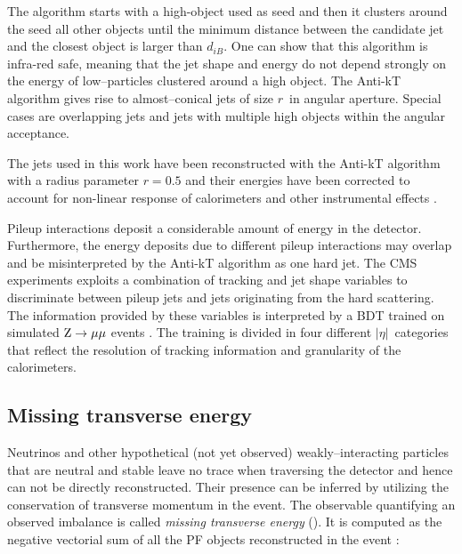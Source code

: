 The algorithm starts with a high-\pT object used as seed and then it clusters around the seed all other objects until the minimum distance between the candidate jet and the closest object is larger than $d_{iB}$. One can show that this algorithm is infra-red safe, meaning that the jet shape and energy do not depend strongly on the energy of low--\pT particles clustered around a high \pT object. The Anti-kT algorithm gives rise to almost--conical jets of size $r$\ in angular aperture. Special cases are overlapping jets and jets with multiple high \pT objects within the angular acceptance.

The jets used in this work have been reconstructed with the Anti-kT algorithm with a radius parameter $r=0.5$ and their energies have been corrected to account for non-linear response of calorimeters and other instrumental effects \cite{Chatrchyan:2011ds}.

Pileup interactions deposit a considerable amount of energy in the detector. %
Furthermore, the energy deposits due to different pileup interactions may overlap and be misinterpreted by the Anti-kT algorithm as one hard jet. The CMS experiments exploits a combination of tracking and jet shape variables to discriminate between pileup jets and jets originating from the hard scattering. The information provided by these variables is interpreted by a BDT 
trained on simulated $\mathrm{Z}\rightarrow\mu\mu$ events \cite{CMS-PAS-JME-13-005}. The training is divided in four different $|\eta|$\ categories that reflect the resolution of tracking information and granularity of the calorimeters.

\subsection{Missing transverse energy}

Neutrinos and other hypothetical (not yet observed) weakly--interacting particles that are neutral and stable leave no trace when traversing the detector and hence can not be directly reconstructed. Their presence can be inferred by utilizing the conservation of transverse momentum in the event. The observable quantifying an observed imbalance is called \emph{missing transverse energy} (\MET). It is computed as the negative vectorial sum of all the PF objects reconstructed in the event \cite{CMS-PAS-JME-13-003}: 

